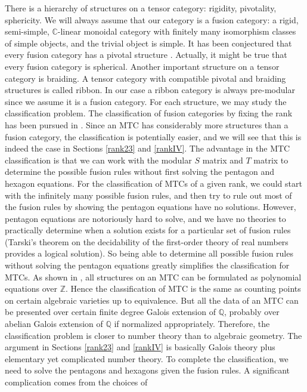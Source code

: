 \documentclass[12pt,psamsfonts]{amsart}
\newcommand{\Q}{\mathbb Q}
\newcommand{\C}{\mathbb C}
\newcommand{\Z}{\mathbb Z}
\numberwithin{equation}{section}
\theoremstyle{definition}
\begin{document}
There is a hierarchy of structures on a tensor category: rigidity,
pivotality, sphericity.  We will always assume that our category
is a fusion category: a rigid, semi-simple, $\C$-linear monoidal
category with finitely many isomorphism classes of simple objects,
and the trivial object is simple.  It has been conjectured that
every fusion category has a pivotal structure \cite{ENO}.
Actually, it might be true that every fusion category is
spherical. Another important structure on a tensor category is
braiding.  A tensor category with compatible pivotal and braiding
structures is called ribbon. In our case a ribbon category is
always pre-modular since we assume it is a fusion category.  For
each structure, we may study the classification problem.  The
classification of fusion categories by fixing the rank has been
pursued in \cite{Ostrik1}\cite{Ostrik2}. Since an MTC has
considerably more structures than a fusion category, the
classification is potentially easier, and we will see that this is
indeed the case in Sections \ref{rank23} and \ref{rankIV}. The
advantage in the MTC classification is that we can work with the
modular $S$ matrix and $T$ matrix to determine the possible fusion
rules without first solving the pentagon and hexagon equations.
For the classification of MTCs of a given rank, we could start
with the infinitely many possible fusion rules, and then try to
rule out most of the fusion rules by showing the pentagon
equations have no solutions. However, pentagon equations are
notoriously hard to solve, and we have no theories to practically
determine when a solution exists for a particular set of fusion
rules (Tarski's theorem on the decidability of the first-order
theory of real numbers provides a logical solution). So being able
to determine all possible fusion rules without solving the
pentagon equations greatly simplifies the classification for MTCs.
As shown in \cite{HH}, all structures on an MTC can be formulated
as polynomial equations over $\Z$. Hence the classification of MTC
is the same as counting points on certain algebraic varieties up to equivalence.
But all the data of an MTC can be presented over certain finite degree
Galois extension of $\Q$, probably over abelian Galois extension
of $\Q$ if normalized appropriately. Therefore, the classification
problem is closer to number theory than to algebraic geometry. The
argument in Sections \ref{rank23} and \ref{rankIV} is basically
Galois theory plus elementary yet complicated number theory. To
complete the classification, we need to solve the pentagons and
hexagons given the fusion rules. A significant complication comes from the choices of
\end{document}
